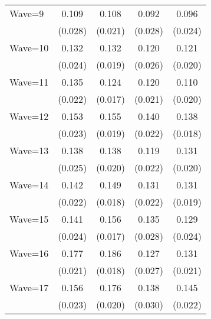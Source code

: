 {\begin{tabular}{l*{4}{c}}
Wave=9              &       0.109\sym{***}&       0.108\sym{***}&       0.092\sym{***}&       0.096\sym{***}\\
                    &     (0.028)         &     (0.021)         &     (0.028)         &     (0.024)         \\
Wave=10             &       0.132\sym{***}&       0.132\sym{***}&       0.120\sym{***}&       0.121\sym{***}\\
                    &     (0.024)         &     (0.019)         &     (0.026)         &     (0.020)         \\
Wave=11             &       0.135\sym{***}&       0.124\sym{***}&       0.120\sym{***}&       0.110\sym{***}\\
                    &     (0.022)         &     (0.017)         &     (0.021)         &     (0.020)         \\
Wave=12             &       0.153\sym{***}&       0.155\sym{***}&       0.140\sym{***}&       0.138\sym{***}\\
                    &     (0.023)         &     (0.019)         &     (0.022)         &     (0.018)         \\
Wave=13             &       0.138\sym{***}&       0.138\sym{***}&       0.119\sym{***}&       0.131\sym{***}\\
                    &     (0.025)         &     (0.020)         &     (0.022)         &     (0.020)         \\
Wave=14             &       0.142\sym{***}&       0.149\sym{***}&       0.131\sym{***}&       0.131\sym{***}\\
                    &     (0.022)         &     (0.018)         &     (0.022)         &     (0.019)         \\
Wave=15             &       0.141\sym{***}&       0.156\sym{***}&       0.135\sym{***}&       0.129\sym{***}\\
                    &     (0.024)         &     (0.017)         &     (0.028)         &     (0.024)         \\
Wave=16             &       0.177\sym{***}&       0.186\sym{***}&       0.127\sym{***}&       0.131\sym{***}\\
                    &     (0.021)         &     (0.018)         &     (0.027)         &     (0.021)         \\
Wave=17             &       0.156\sym{***}&       0.176\sym{***}&       0.138\sym{***}&       0.145\sym{***}\\
                    &     (0.023)         &     (0.020)         &     (0.030)         &     (0.022)         \\

\end{tabular}}
